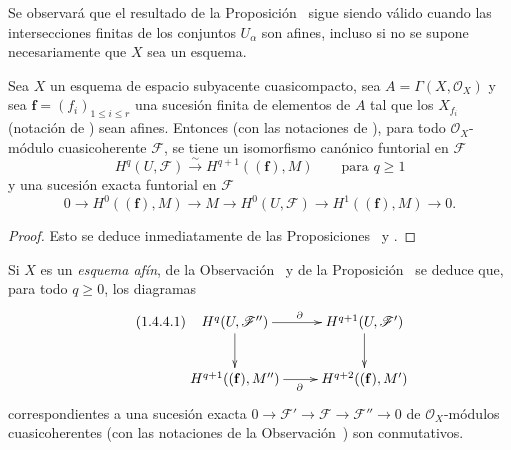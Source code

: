 \begin{remark}[1.4.2]
\label{III.1.4.2}
\label{III.1.4.2-fr}
Se observará que el resultado de la Proposición~ sigue siendo válido cuando las intersecciones finitas de los conjuntos $U_\alpha$ son afines, incluso si no se supone necesariamente que $X$ sea un esquema.
\end{remark}

\begin{corollary}[1.4.3]
\label{III.1.4.3}
\label{III.1.4.3-fr}
Sea $X$ un esquema de espacio subyacente cuasicompacto, sea $A=\Gamma(X,\mathcal O_X)$ y sea $\mathbf f=(f_i)_{1\leq i\leq r}$ una sucesión finita de elementos de $A$ tal que los $X_{f_i}$ (notación de ) sean afines.
Entonces (con las notaciones de ), para todo $\mathcal O_X$-módulo cuasicoherente $\mathcal F$, se tiene un isomorfismo canónico funtorial en $\mathcal F$
\begin{equation}
\label{III.1.4.3.1-fr}
\tag{1.4.3.1}
H^q(U,\mathcal F)\xrightarrow{\sim}H^{q+1}((\mathbf f),M)
\qquad\text{para }q\geq1
\end{equation}
y una sucesión exacta funtorial en $\mathcal F$
\begin{equation}
\label{III.1.4.3.2-fr}
\tag{1.4.3.2}
0\longrightarrow H^0((\mathbf f),M)\longrightarrow M
\longrightarrow H^0(U,\mathcal F)
\longrightarrow H^1((\mathbf f),M)\longrightarrow0.
\end{equation}
\end{corollary}

\begin{proof}
Esto se deduce inmediatamente de las Proposiciones~ y .
\end{proof}

\begin{env}[1.4.4]
\label{III.1.4.4}
\label{III.1.4.4-fr}
Si $X$ es un \emph{esquema afín}, de la Observación~ y de la Proposición~ se deduce que, para todo $q\geq0$, los diagramas
\begin{equation}
\label{III.1.4.4.1-fr}
\tag{1.4.4.1}
\xymatrix{
H^q(U,\mathcal F'')\ar[r]^{\partial}\ar[d]
&H^{q+1}(U,\mathcal F')\ar[d]\\
H^{q+1}((\mathbf f),M'')\ar[r]_{\partial}
&H^{q+2}((\mathbf f),M')
}
\end{equation}
correspondientes a una sucesión exacta $0\to\mathcal F'\to\mathcal F\to\mathcal F''\to0$ de $\mathcal O_X$-módulos cuasicoherentes (con las notaciones de la Observación~) son conmutativos.
\end{env}


